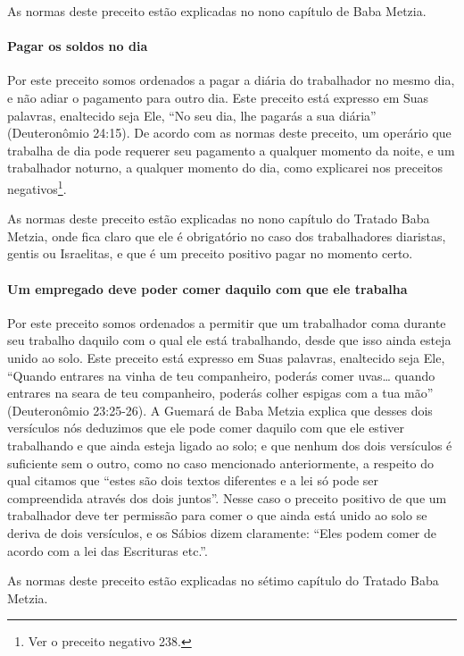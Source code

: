 As normas deste preceito estão explicadas no nono capítulo de Baba
Metzia.

\paragraph{Pagar os soldos no dia}

Por este preceito somos ordenados a pagar a diária do trabalhador no
mesmo dia, e não adiar o pagamento para outro dia. Este preceito está
expresso em Suas palavras, enaltecido seja Ele, ``No seu dia, lhe
pagarás a sua diária'' (Deuteronômio 24:15). De acordo com as normas
deste preceito, um operário que trabalha de dia pode requerer seu
pagamento a qualquer momento da noite, e um trabalhador noturno, a
qualquer momento do dia, como explicarei nos preceitos
negativos\footnote{Ver o preceito negativo 238.}.

As normas deste preceito estão explicadas no nono capítulo do Tratado
Baba Metzia, onde fica claro que ele é obrigatório no caso dos
trabalhadores diaristas, gentis ou Israelitas, e que é um preceito
positivo pagar no momento certo.

\paragraph{Um empregado deve poder comer daquilo com que ele trabalha}

Por este preceito somos ordenados a permitir que um trabalhador coma
durante seu trabalho daquilo com o qual ele está trabalhando, desde que
isso ainda esteja unido ao solo. Este preceito está expresso em Suas
palavras, enaltecido seja Ele, ``Quando entrares na vinha de teu
companheiro, poderás comer uvas\ldots{} quando entrares na seara de teu
companheiro, poderás colher espigas com a tua mão'' (Deuteronômio
23:25-26). A Guemará de Baba Metzia explica que desses dois versículos
nós deduzimos que ele pode comer daquilo com que ele estiver trabalhando
e que ainda esteja ligado ao solo; e que nenhum dos dois versículos é
suficiente sem o outro, como no caso mencionado
anteriormente, a respeito do qual citamos que ``estes são dois textos
diferentes e a lei só pode ser compreendida através dos dois juntos''.
Nesse caso o preceito positivo de que um trabalhador deve ter permissão
para comer o que ainda está unido ao solo se deriva de dois versículos,
e os Sábios dizem claramente: ``Eles podem comer de acordo com a lei das
Escrituras etc.''.

As normas deste preceito estão explicadas no sétimo capítulo do Tratado Baba Metzia.

